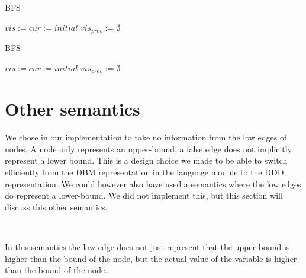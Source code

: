 \begin{algorithm}
\caption{BFS}\label{alg:bfs-check}
\begin{algorithmic}[1]
	\State $vis := cur := initial$
	\State $vis_{prev} := \emptyset$
	\EndWhile
	
\EndProcedure	
\end{algorithmic}
\end{algorithm}

\begin{algorithm}
\caption{BFS}\label{alg:bfs-no-minus}
\begin{algorithmic}[1]
	\State $vis := cur := initial$
	\State $vis_{prev} := \emptyset$
	\EndWhile
	
\EndProcedure	
\end{algorithmic}
\end{algorithm}

\section{Other semantics}
We chose in our implementation to take no information from the low edges of nodes. A node only represents an upper-bound, a false edge does not implicitly represent a lower bound. This is a design choice we made to be able to switch efficiently from the DBM representation in the language module to the DDD representation. We could however also have used a semantics where the low edges do represent a lower-bound. We did not implement this, but this section will discuss this other semantics. 

\begin{mydef}
\label{def:Semantics2}\


\end{mydef}
In this semantics the low edge does not just represent that the upper-bound is higher than the bound of the node, but the actual value of the variable is higher than the bound of the node. 

